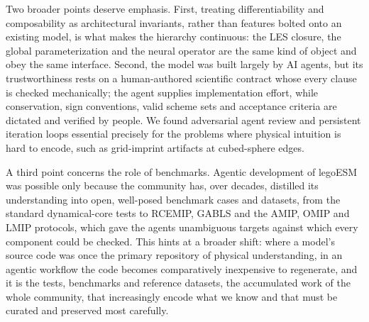 \documentclass[11pt]{article}
\begin{document}
Two broader points deserve emphasis. First, treating differentiability and composability as
architectural invariants, rather than features bolted onto an existing model, is what makes the
hierarchy continuous: the LES closure, the global parameterization and the neural operator are
the same kind of object and obey the same interface. Second, the model was built largely by AI
agents, but its trustworthiness rests on a human-authored scientific contract whose every
clause is checked mechanically; the agent supplies implementation effort, while conservation,
sign conventions, valid scheme sets and acceptance criteria are dictated and verified by people.
We found adversarial agent review and persistent iteration loops essential precisely for the
problems where physical intuition is hard to encode, such as grid-imprint artifacts at
cubed-sphere edges.

A third point concerns the role of benchmarks. Agentic development of legoESM was possible only
because the community has, over decades, distilled its understanding into open, well-posed
benchmark cases and datasets, from the standard dynamical-core tests to RCEMIP, GABLS and the
AMIP, OMIP and LMIP protocols, which gave the agents unambiguous targets against which every
component could be checked. This hints at a broader shift: where a model's source code was once
the primary repository of physical understanding, in an agentic workflow the code becomes
comparatively inexpensive to regenerate, and it is the tests, benchmarks and reference datasets,
the accumulated work of the whole community, that increasingly encode what we know and that must
be curated and preserved most carefully.
\end{document}
